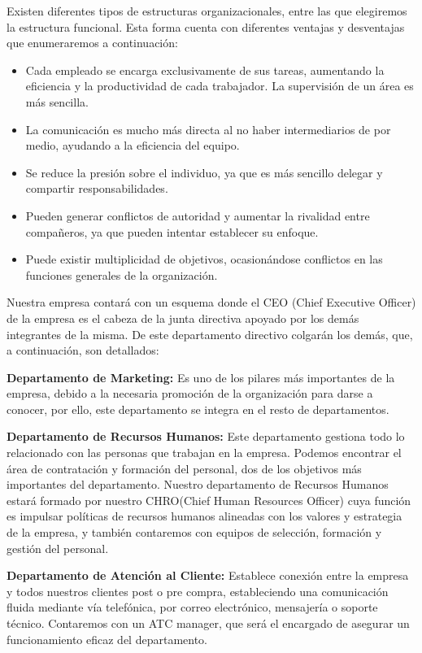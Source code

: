 Existen diferentes tipos de estructuras organizacionales, entre las que elegiremos la estructura funcional. Esta forma cuenta con diferentes ventajas y desventajas que enumeraremos a continuación:

\begin{itemize}
    \item Cada empleado se encarga exclusivamente de sus tareas, aumentando la eficiencia y la productividad de cada trabajador.
    La supervisión de un área es más sencilla.
    \item La comunicación es mucho más directa al no haber intermediarios de por medio, ayudando a la eficiencia del equipo.
    \item Se reduce la presión sobre el individuo, ya que es más sencillo delegar y compartir responsabilidades.
    \item Pueden generar conflictos de autoridad y aumentar la rivalidad entre compañeros, ya que pueden intentar establecer su enfoque.
    \item Puede existir multiplicidad de objetivos, ocasionándose conflictos en las funciones generales de la organización.    
\end{itemize}

Nuestra empresa contará con un esquema donde el CEO (Chief Executive Officer) de la empresa es el cabeza de la junta directiva apoyado por los demás integrantes de la misma. De este departamento directivo colgarán los demás, que, a continuación, son detallados:

\textbf{Departamento de Marketing:} Es uno de los pilares más importantes de la empresa, debido a la necesaria promoción de la organización para darse a conocer, por ello, este departamento se integra en el resto de departamentos.

\textbf{Departamento de Recursos Humanos:} Este departamento gestiona todo lo relacionado con las personas que trabajan en la empresa. Podemos encontrar el área de contratación y formación del personal, dos de los objetivos más importantes del departamento. Nuestro departamento de Recursos Humanos estará formado por nuestro CHRO(Chief Human Resources Officer) cuya función es impulsar políticas de recursos humanos alineadas con los valores y estrategia de la empresa, y también contaremos con equipos de selección, formación y  gestión del personal.

\textbf{Departamento de Atención al Cliente:} Establece conexión entre la empresa y todos nuestros clientes post o pre compra, estableciendo una comunicación fluida mediante vía telefónica, por correo electrónico, mensajería o soporte técnico. Contaremos con un ATC manager, que será el encargado de asegurar un funcionamiento eficaz del departamento.

